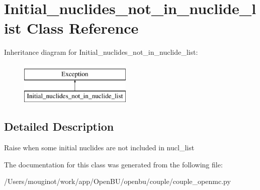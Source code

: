 \hypertarget{classopenbu_1_1couple_1_1couple__openmc_1_1_initial__nuclides__not__in__nuclide__list}{}\section{Initial\+\_\+nuclides\+\_\+not\+\_\+in\+\_\+nuclide\+\_\+list Class Reference}
\label{classopenbu_1_1couple_1_1couple__openmc_1_1_initial__nuclides__not__in__nuclide__list}
Inheritance diagram for Initial\+\_\+nuclides\+\_\+not\+\_\+in\+\_\+nuclide\+\_\+list\+:\begin{figure}[H]
\begin{center}
\leavevmode
\includegraphics[height=2.000000cm]{classopenbu_1_1couple_1_1couple__openmc_1_1_initial__nuclides__not__in__nuclide__list}
\end{center}
\end{figure}


\subsection{Detailed Description}
\begin{DoxyVerb}Raise when some initial nuclides are not included in nucl_list \end{DoxyVerb}
 

The documentation for this class was generated from the following file\+:\begin{DoxyCompactItemize}
\item 
/\+Users/mouginot/work/app/\+Open\+B\+U/openbu/couple/couple\+\_\+openmc.\+py\end{DoxyCompactItemize}
